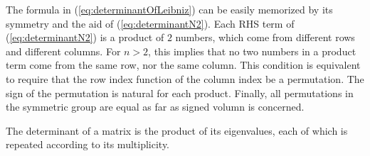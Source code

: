 \begin{rem}
  The formula in (\ref{eq:determinantOfLeibniz})
  can be easily memorized by its symmetry
  and the aid of (\ref{eq:determinantN2}).
  Each RHS term of (\ref{eq:determinantN2}) is a product of $2$
  numbers,
  which come from different rows and different columns.
  For $n>2$, this implies that
  no two numbers in a product term
  come from the same row, nor the same column.
  This condition is equivalent to require
  that the row index function of the column index
  be a permutation.
  The sign of the permutation is natural
  for each product.
  Finally, all permutations in the symmetric group
  are equal as far as signed volumn is concerned.
\end{rem}

\begin{lem}
  \label{lem:determinantIsProductOfEigenvalues}
  The determinant of a matrix is the product of its eigenvalues, 
  each of which is repeated according to its multiplicity.
\end{lem}

